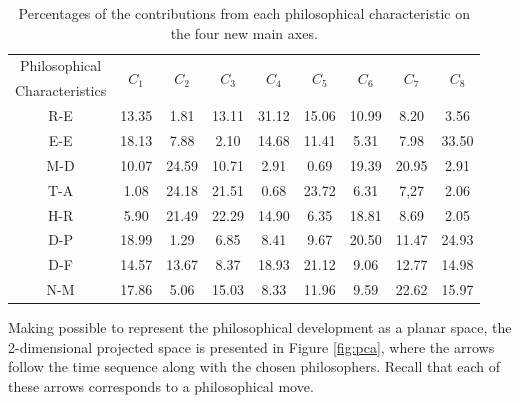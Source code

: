 \documentclass[%
 aip,
 jmp,%
 amsmath,amssymb,
 reprint,%
]{revtex4-1}
\begin{document}

\begin{table}%
\caption{\label{tab:Deviates}Percentages of
the contributions from each philosophical characteristic on the four new main axes.  }
\begin{tabular}{|c||c|c|c|c|c|c|c|c|}
\hline
Philosophical & \multirow{2}{*}{$C_1$} & \multirow{2}{*}{$C_2$} & \multirow{2}{*}{$C_3$} & \multirow{2}{*}{$C_4$} & \multirow{2}{*}{$C_5$} & \multirow{2}{*}{$C_6$} & \multirow{2}{*}{$C_7$} & \multirow{2}{*}{$C_8$}\\
Characteristics & & & & & & & & \\
\hline
R-E & 13.35   &  1.81 & 13.11 & 31.12 & 15.06 & 10.99 &  8.20 &  3.56 \\
E-E & 18.13   &  7.88 &  2.10 & 14.68 & 11.41 &  5.31 &  7.98 & 33.50 \\
M-D & 10.07   & 24.59 & 10.71 &  2.91 &  0.69 & 19.39 & 20.95 &  2.91 \\
T-A &  1.08   & 24.18 & 21.51 &  0.68 & 23.72 &  6.31 &  7,27 &  2.06 \\
H-R &  5.90   & 21.49 & 22.29 & 14.90 &  6.35 & 18.81 &  8.69 &  2.05 \\
D-P & 18.99   &  1.29 &  6.85 &  8.41 &  9.67 & 20.50 & 11.47 & 24.93 \\
D-F & 14.57   & 13.67 &  8.37 & 18.93 & 21.12 &  9.06 & 12.77 & 14.98 \\
N-M & 17.86   &  5.06 & 15.03 &  8.33 & 11.96 &  9.59 & 22.62 & 15.97 \\
\hline

\end{tabular}
\end{table}

Making possible to represent the philosophical development as a planar space, the 2-dimensional projected space is presented in Figure
\ref{fig:pca}, where the arrows follow the time sequence along with
the chosen philosophers.  Recall that each of these arrows corresponds
to a philosophical move.  


\end{document}
